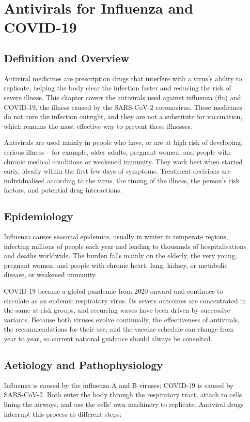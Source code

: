 \chapter{Antivirals for Influenza and COVID-19}

\section*{Definition and Overview}
Antiviral medicines are prescription drugs that interfere with a virus's ability to replicate, helping the body clear the infection faster and reducing the risk of severe illness. This chapter covers the antivirals used against influenza (flu) and COVID-19, the illness caused by the SARS-CoV-2 coronavirus. These medicines do not cure the infection outright, and they are not a substitute for vaccination, which remains the most effective way to prevent these illnesses.

Antivirals are used mainly in people who have, or are at high risk of developing, serious illness -- for example, older adults, pregnant women, and people with chronic medical conditions or weakened immunity. They work best when started early, ideally within the first few days of symptoms. Treatment decisions are individualised according to the virus, the timing of the illness, the person's risk factors, and potential drug interactions.

\section*{Epidemiology}
Influenza causes seasonal epidemics, usually in winter in temperate regions, infecting millions of people each year and leading to thousands of hospitalisations and deaths worldwide. The burden falls mainly on the elderly, the very young, pregnant women, and people with chronic heart, lung, kidney, or metabolic disease, or weakened immunity.

COVID-19 became a global pandemic from 2020 onward and continues to circulate as an endemic respiratory virus. Its severe outcomes are concentrated in the same at-risk groups, and recurring waves have been driven by successive variants. Because both viruses evolve continually, the effectiveness of antivirals, the recommendations for their use, and the vaccine schedule can change from year to year, so current national guidance should always be consulted.

\section*{Aetiology and Pathophysiology}
Influenza is caused by the influenza A and B viruses; COVID-19 is caused by SARS-CoV-2. Both enter the body through the respiratory tract, attach to cells lining the airways, and use the cells' own machinery to replicate. Antiviral drugs interrupt this process at different steps:

